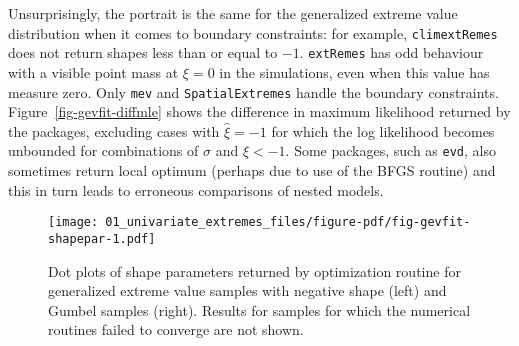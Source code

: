 \documentclass[
  letterpaper,
  DIV=11,
  numbers=noendperiod]{scrartcl}
\begin{document}
Unsurprisingly, the portrait is the same for the generalized extreme
value distribution when it comes to boundary constraints: for example,
\texttt{climextRemes} does not return shapes less than or equal to
\(-1\). \texttt{extRemes} has odd behaviour with a visible point mass at
\(\xi=0\) in the simulations, even when this value has measure zero.
Only \texttt{mev} and \texttt{SpatialExtremes} handle the boundary
constraints. Figure~\ref{fig-gevfit-diffmle} shows the difference in
maximum likelihood returned by the packages, excluding cases with
\(\widehat{\xi}=-1\) for which the log likelihood becomes unbounded for
combinations of \(\sigma\) and \(\xi<-1\). Some packages, such as
\texttt{evd}, also sometimes return local optimum (perhaps due to use of
the BFGS routine) and this in turn leads to erroneous comparisons of
nested models.

\begin{figure}

{\centering \texttt{[image: 01\_univariate\_extremes\_files/figure-pdf/fig-gevfit-shapepar-1.pdf]}

}

\caption{\label{fig-gevfit-shapepar}Dot plots of shape parameters
returned by optimization routine for generalized extreme value samples
with negative shape (left) and Gumbel samples (right). Results for
samples for which the numerical routines failed to converge are not
shown.}

\end{figure}
\end{document}
